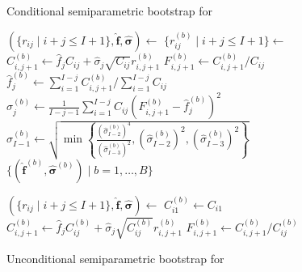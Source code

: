 \documentclass[a4paper]{book}
\begin{document}
\begin{figure}[p]
  \begin{algorithm}[H]
    \caption{Conditional semiparametric bootstrap for }
    \label{alg:cond-semiparam-mack}
    \begin{algorithmic}
      \State $(\{ r_{ij} \mid i + j \leq I + 1 \}, \bm{\widehat{f}}, \bm{\widehat{\sigma}}) \gets$ 
        \State $\{ r^{(b)}_{ij} \mid i + j \leq I + 1 \} \gets$ 
            \State $C^{(b)}_{i, j + 1} \gets \widehat{f}_j C_{ij} + \widehat{\sigma}_j \sqrt{C_{ij}} r^{(b)}_{i, j + 1}$
            \State $\displaystyle F^{(b)}_{i, j + 1} \gets C^{(b)}_{i, j + 1} / C_{ij}$
          \EndFor
          \State $\widehat{f}^{(b)}_j \gets \sum_{i = 1}^{I - j} C^{(b)}_{i, j + 1} / \sum_{i = 1}^{I - j} C_{ij}$
            \State $\displaystyle \widehat{\sigma}^{(b)}_j \gets \frac{1}{I - j - 1}\sum_{i = 1}^{I - j} C_{ij} \left( F^{(b)}_{i, j + 1} - \widehat{f}^{(b)}_j \right)^2$
          \Else
            \State $\widehat{\sigma}^{(b)}_{I - 1} \gets \sqrt{\min{ \left \{ \displaystyle \frac{(\widehat{\sigma}^{(b)}_{I - 2})^4}{(\widehat{\sigma}^{(b)}_{I - 3})^2}, (\widehat{\sigma}^{(b)}_{I - 2})^2, (\widehat{\sigma}^{(b)}_{I - 3})^2 \right \} }}$
          \EndIf
        \EndFor
      \EndFor
      \State \Return $\{ (\widehat{\bm{f}}^{(b)}, \widehat{\bm{\sigma}}^{(b)}) \mid b = 1, \dots, B \}$
    \end{algorithmic}
  \end{algorithm}
  \begin{algorithm}[H]
    \caption{Unconditional semiparametric bootstrap for }
    \label{alg:uncond-semiparam-mack}
    \begin{algorithmic}
      \State $(\{ r_{ij} \mid i + j \leq I + 1 \}, \bm{\widehat{f}}, \bm{\widehat{\sigma}}) \gets$ 
          \State $C^{(b)}_{i1} \gets C_{i1}$
        \EndFor
            \State $C^{(b)}_{i, j + 1} \gets \widehat{f}_j C^{(b)}_{ij} + \widehat{\sigma}_j \sqrt{C^{(b)}_{ij}} r^{(b)}_{i, j + 1}$
            \State $\displaystyle F^{(b)}_{i, j + 1} \gets C^{(b)}_{i, j + 1} / C^{(b)}_{ij}$

\end{algorithmic}
\end{algorithm}
\end{figure}
\end{document}
